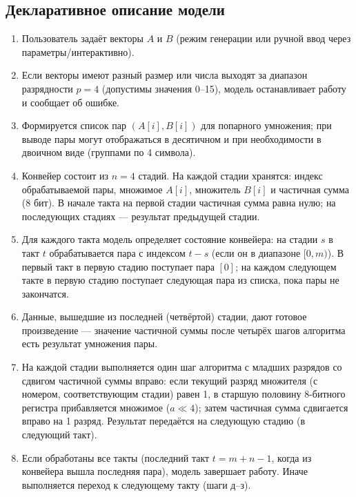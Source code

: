 \subsection*{Декларативное описание модели}

\begin{enumerate}
    \item[\textbf{а)}] Пользователь задаёт векторы $A$ и $B$ (режим генерации или ручной ввод через параметры/интерактивно).
    
    \item[\textbf{б)}] Если векторы имеют разный размер или числа выходят за диапазон разрядности $p=4$ (допустимы значения 0--15), модель останавливает работу и сообщает об ошибке.
    
    \item[\textbf{в)}] Формируется список пар $(A[i], B[i])$ для попарного умножения; при выводе пары могут отображаться в десятичном и при необходимости в двоичном виде (группами по 4 символа).
    
    \item[\textbf{г)}] Конвейер состоит из $n=4$ стадий. На каждой стадии хранятся: индекс обрабатываемой пары, множимое $A[i]$, множитель $B[i]$ и частичная сумма (8 бит). В начале такта на первой стадии частичная сумма равна нулю; на последующих стадиях --- результат предыдущей стадии.
    
    \item[\textbf{д)}] Для каждого такта модель определяет состояние конвейера: на стадии $s$ в такт $t$ обрабатывается пара с индексом $t-s$ (если он в диапазоне $[0, m)$). В первый такт в первую стадию поступает пара $[0]$; на каждом следующем такте в первую стадию поступает следующая пара из списка, пока пары не закончатся.
    
    \item[\textbf{е)}] Данные, вышедшие из последней (четвёртой) стадии, дают готовое произведение --- значение частичной суммы после четырёх шагов алгоритма есть результат умножения пары.
    
    \item[\textbf{ж)}] На каждой стадии выполняется один шаг алгоритма с младших разрядов со сдвигом частичной суммы вправо: если текущий разряд множителя (с номером, соответствующим стадии) равен 1, в старшую половину 8-битного регистра прибавляется множимое ($a \ll 4$); затем частичная сумма сдвигается вправо на 1 разряд. Результат передаётся на следующую стадию (в следующий такт).
    
    \item[\textbf{з)}] Если обработаны все такты (последний такт $t = m + n - 1$, когда из конвейера вышла последняя пара), модель завершает работу. Иначе выполняется переход к следующему такту (шаги д--з).
\end{enumerate}

